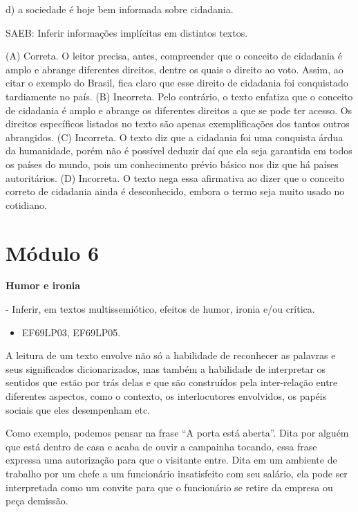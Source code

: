 d) a sociedade é hoje bem informada sobre cidadania.

SAEB: Inferir informações implícitas em distintos textos.

(A) Correta. O leitor precisa, antes, compreender que o conceito de
cidadania é amplo e abrange diferentes direitos, dentre os quais o
direito ao voto. Assim, ao citar o exemplo do Brasil, fica claro que
esse direito de cidadania foi conquistado tardiamente no país. (B)
Incorreta. Pelo contrário, o texto enfatiza que o conceito de cidadania
é amplo e abrange os diferentes direitos a que se pode ter acesso. Os
direitos específicos listados no texto são apenas exemplificações dos
tantos outros abrangidos. (C) Incorreta. O texto diz que a cidadania foi
uma conquista árdua da humanidade, porém não é possível deduzir daí que
ela seja garantida em todos os países do mundo, pois um conhecimento
prévio básico nos diz que há países autoritários. (D) Incorreta. O texto
nega essa afirmativa ao dizer que o conceito correto de cidadania ainda
é desconhecido, embora o termo seja muito usado no cotidiano.

\hypertarget{muxf3dulo-6}{%
\section{Módulo 6}\label{muxf3dulo-6}}

\textbf{Humor e ironia}

 - Inferir, em textos multissemiótico,
efeitos de humor, ironia e/ou crítica.


\begin{itemize}
\tightlist
\item
  EF69LP03, EF69LP05.
\end{itemize}

A leitura de um texto envolve não só a habilidade de reconhecer as
palavras e seus significados dicionarizados, mas também a habilidade de
interpretar os sentidos que estão por trás delas e que são construídos
pela inter-relação entre diferentes aspectos, como o contexto, os
interlocutores envolvidos, os papéis sociais que eles desempenham etc.

Como exemplo, podemos pensar na frase ``A porta está aberta''. Dita por
alguém que está dentro de casa e acaba de ouvir a campainha tocando,
essa frase expressa uma autorização para que o visitante entre. Dita em
um ambiente de trabalho por um chefe a um funcionário insatisfeito com
seu salário, ela pode ser interpretada como um convite para que o
funcionário se retire da empresa ou peça demissão.

